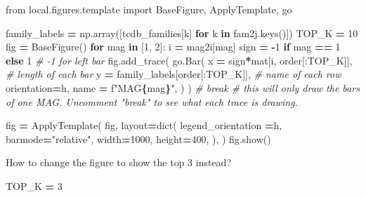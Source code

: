 \documentclass[
]{book}
\newenvironment{Shaded}{\begin{snugshade}}{\end{snugshade}}
\newcommand{\BuiltInTok}[1]{#1}
\newcommand{\CommentTok}[1]{\textcolor[rgb]{0.56,0.35,0.01}{\textit{#1}}}
\newcommand{\ControlFlowTok}[1]{\textcolor[rgb]{0.13,0.29,0.53}{\textbf{#1}}}
\newcommand{\DecValTok}[1]{\textcolor[rgb]{0.00,0.00,0.81}{#1}}
\newcommand{\ImportTok}[1]{#1}
\newcommand{\KeywordTok}[1]{\textcolor[rgb]{0.13,0.29,0.53}{\textbf{#1}}}
\newcommand{\NormalTok}[1]{#1}
\newcommand{\OperatorTok}[1]{\textcolor[rgb]{0.81,0.36,0.00}{\textbf{#1}}}
\newcommand{\SpecialCharTok}[1]{\textcolor[rgb]{0.81,0.36,0.00}{\textbf{#1}}}
\newcommand{\SpecialStringTok}[1]{\textcolor[rgb]{0.31,0.60,0.02}{#1}}
\newcommand{\StringTok}[1]{\textcolor[rgb]{0.31,0.60,0.02}{#1}}
\begin{document}
\begin{Shaded}
\begin{Highlighting}[numbers=left,,]
\ImportTok{from}\NormalTok{ local.figures.template }\ImportTok{import}\NormalTok{ BaseFigure, ApplyTemplate, go}

\NormalTok{family\_labels }\OperatorTok{=}\NormalTok{ np.array([tcdb\_families[k] }\ControlFlowTok{for}\NormalTok{ k }\KeywordTok{in}\NormalTok{ fam2j.keys()])}
\NormalTok{TOP\_K }\OperatorTok{=} \DecValTok{10}
\NormalTok{fig }\OperatorTok{=}\NormalTok{ BaseFigure()}
\ControlFlowTok{for}\NormalTok{ mag }\KeywordTok{in}\NormalTok{ [}\DecValTok{1}\NormalTok{, }\DecValTok{2}\NormalTok{]:}
\NormalTok{    i }\OperatorTok{=}\NormalTok{ mag2i[mag]}
\NormalTok{    sign }\OperatorTok{=} \OperatorTok{{-}}\DecValTok{1} \ControlFlowTok{if}\NormalTok{ mag }\OperatorTok{==} \DecValTok{1} \ControlFlowTok{else} \DecValTok{1} \CommentTok{\# {-}1 for left bar}
\NormalTok{    fig.add\_trace(}
\NormalTok{        go.Bar(}
\NormalTok{            x }\OperatorTok{=}\NormalTok{ sign}\OperatorTok{*}\NormalTok{mat[i, order[:TOP\_K]],     }\CommentTok{\# length of each bar}
\NormalTok{            y }\OperatorTok{=}\NormalTok{ family\_labels[order[:TOP\_K]],   }\CommentTok{\# name of each row}
\NormalTok{            orientation}\OperatorTok{=}\StringTok{\textquotesingle{}h\textquotesingle{}}\NormalTok{,}
\NormalTok{            name }\OperatorTok{=} \SpecialStringTok{f"MAG}\SpecialCharTok{\{}\NormalTok{mag}\SpecialCharTok{\}}\SpecialStringTok{"}\NormalTok{,}
\NormalTok{        )}
\NormalTok{    )}
    \CommentTok{\# break \# this will only draw the bars of one MAG. Uncomment "break" to see what each trace is drawing.}

\NormalTok{fig }\OperatorTok{=}\NormalTok{ ApplyTemplate(}
\NormalTok{    fig,}
\NormalTok{    layout}\OperatorTok{=}\BuiltInTok{dict}\NormalTok{(}
\NormalTok{        legend\_orientation }\OperatorTok{=}\StringTok{\textquotesingle{}h\textquotesingle{}}\NormalTok{,}
\NormalTok{        barmode}\OperatorTok{=}\StringTok{"relative"}\NormalTok{,}
\NormalTok{        width}\OperatorTok{=}\DecValTok{1000}\NormalTok{, height}\OperatorTok{=}\DecValTok{400}\NormalTok{,}
\NormalTok{    ),}
\NormalTok{)}
\NormalTok{fig.show()}
\end{Highlighting}
\end{Shaded}

How to change the figure to show the top 3 instead?

\begin{Shaded}
\begin{Highlighting}[numbers=left,,]
\NormalTok{TOP\_K }\OperatorTok{=} \DecValTok{3}
\end{Highlighting}
\end{Shaded}
\end{document}

